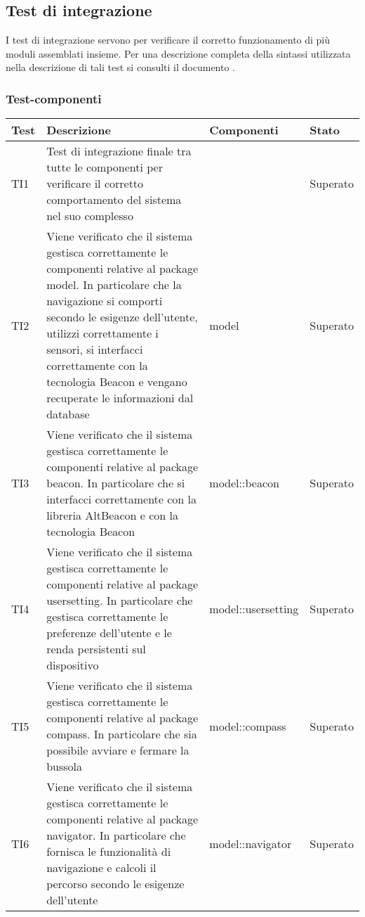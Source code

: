 \documentclass[../PianoDiQualifica.tex]{subfiles}
\begin{document}
\begin{appendices}
	\subsection{Test di integrazione}
		I test di integrazione servono per verificare il corretto funzionamento di più moduli assemblati insieme. Per una descrizione completa della sintassi utilizzata nella descrizione di tali test si consulti il documento \normediprogettov.
		\subsubsection{Test-componenti}
		\begin{longtabu}to \textwidth{X[0.5] X[2] X[2] X}
\toprule
\textbf{Test} & \textbf{Descrizione} & \textbf{Componenti} & \textbf{Stato}\\
\midrule
\endhead
{}
TI1 & Test di integrazione finale tra tutte le componenti per verificare il corretto comportamento del sistema nel suo complesso &  & Superato \\ 
\midrule 
TI2 & Viene verificato che il sistema gestisca correttamente le componenti relative al package model. In particolare che la navigazione si comporti secondo le esigenze dell'utente, utilizzi correttamente i sensori, si interfacci correttamente con la tecnologia Beacon e vengano recuperate le informazioni dal database & model & Superato \\ 
\midrule 
TI3 & Viene verificato che il sistema gestisca correttamente le componenti relative al package beacon. In particolare che si interfacci correttamente con la libreria AltBeacon e con la tecnologia Beacon & model::\-beacon & Superato \\ 
\midrule 
TI4 & Viene verificato che il sistema gestisca correttamente le componenti relative al package usersetting. In particolare che gestisca correttamente le preferenze dell'utente e le renda persistenti sul dispositivo & model::\-usersetting & Superato \\ 
\midrule 
TI5 & Viene verificato che il sistema gestisca correttamente le componenti relative al package compass. In particolare che sia possibile avviare e fermare la bussola & model::\-compass & Superato \\ 
\midrule 
TI6 & Viene verificato che il sistema gestisca correttamente le componenti relative al package navigator. In particolare che fornisca le funzionalità di navigazione e calcoli il percorso secondo le esigenze dell'utente & model::\-navigator & Superato \\ 

\end{longtabu}
\end{appendices}
\end{document}
